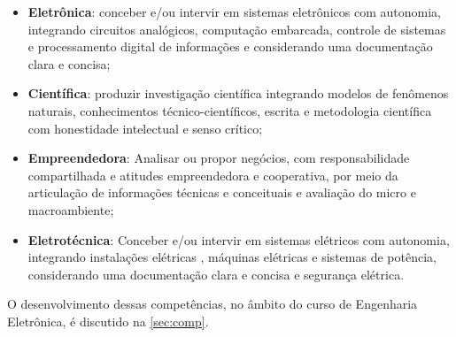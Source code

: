 \begin{itemize}
	\item \textbf{Eletrônica}: conceber e/ou intervir em sistemas eletrônicos com autonomia, integrando circuitos analógicos, computação embarcada, controle de sistemas e 	processamento digital de informações e considerando uma documentação clara e concisa;
	\item \textbf{Científica}: produzir investigação científica integrando modelos de fenômenos naturais, conhecimentos técnico-científicos, escrita e metodologia científica com honestidade intelectual e senso crítico;
	\item \textbf{Empreendedora}: Analisar ou propor negócios, com responsabilidade compartilhada e atitudes empreendedora e cooperativa, por meio da articulação de informações técnicas e conceituais e avaliação do micro e macroambiente;
	\item \textbf{Eletrotécnica}: Conceber e/ou intervir em sistemas elétricos com autonomia, integrando instalações elétricas , máquinas elétricas e sistemas de potência, considerando uma documentação clara e concisa e segurança elétrica.
\end{itemize}

O desenvolvimento dessas competências, no âmbito do curso de Engenharia Eletrônica, é discutido na \autoref{sec:comp}.


